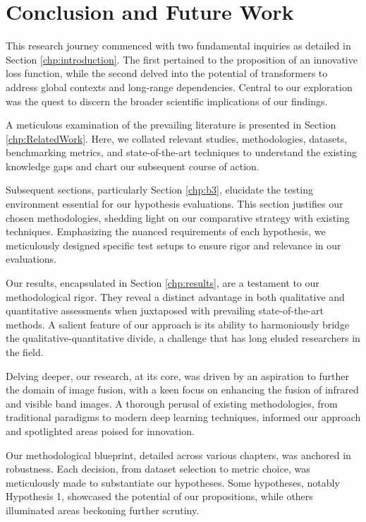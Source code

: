 \chapter{Conclusion and Future Work}
\label{chp:b7}

This research journey commenced with two fundamental inquiries as detailed in Section \ref{chp:introduction}. The first pertained to the proposition of an innovative loss function, while the second delved into the potential of transformers to address global contexts and long-range dependencies. Central to our exploration was the quest to discern the broader scientific implications of our findings.

A meticulous examination of the prevailing literature is presented in Section \ref{chp:RelatedWork}. Here, we collated relevant studies, methodologies, datasets, benchmarking metrics, and state-of-the-art techniques to understand the existing knowledge gaps and chart our subsequent course of action.

Subsequent sections, particularly Section \ref{chp:b3}, elucidate the testing environment essential for our hypothesis evaluations. This section justifies our chosen methodologies, shedding light on our comparative strategy with existing techniques. Emphasizing the nuanced requirements of each hypothesis, we meticulously designed specific test setups to ensure rigor and relevance in our evaluations.

Our results, encapsulated in Section \ref{chp:results}, are a testament to our methodological rigor. They reveal a distinct advantage in both qualitative and quantitative assessments when juxtaposed with prevailing state-of-the-art methods. A salient feature of our approach is its ability to harmoniously bridge the qualitative-quantitative divide, a challenge that has long eluded researchers in the field.

Delving deeper, our research, at its core, was driven by an aspiration to further the domain of image fusion, with a keen focus on enhancing the fusion of infrared and visible band images. A thorough perusal of existing methodologies, from traditional paradigms to modern deep learning techniques, informed our approach and spotlighted areas poised for innovation.

Our methodological blueprint, detailed across various chapters, was anchored in robustness. Each decision, from dataset selection to metric choice, was meticulously made to substantiate our hypotheses. Some hypotheses, notably Hypothesis 1, showcased the potential of our propositions, while others illuminated areas beckoning further scrutiny.

